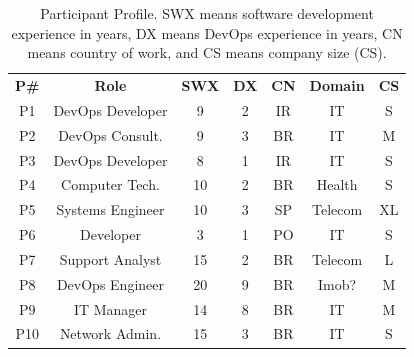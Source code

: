 \begin{table}[t]
\centering
\caption{Participant Profile. SWX means software development experience in years, DX means DevOps experience in years, CN means country of work, and CS means company size (CS).}
\label{participant_table}
\begin{tabular}{ccccccc}
\textbf{P\#}          & \textbf{Role}         & \textbf{SWX} & \textbf{DX} & \textbf{CN}   & \textbf{Domain}    & \multicolumn{1}{l}{\textbf{CS}} \\
P1                   & DevOps Developer      & 9            & 2           & IR            & IT                 & S                               \\

P2                   & DevOps Consult.       & 9            & 3           & BR            & IT                 & M                               \\

P3                   & DevOps Developer      & 8            & 1           & IR            & IT                 & S                               \\

P4                   & Computer Tech.        & 10           & 2           & BR            & Health             & S                               \\

P5                   & Systems Engineer      & 10           & 3           & SP            & Telecom            & XL                              \\

P6                   & Developer             & 3            & 1           & PO            & IT                 & S                               \\

P7                   & Support Analyst       & 15           & 2           & BR            & Telecom            & L                               \\

P8                   & DevOps Engineer       & 20           & 9           & BR            & Imob?              & M                               \\

P9                   & IT Manager            & 14           & 8           & BR            & IT                 & M                               \\

P10                  & Network Admin.        & 15           & 3           & BR            & IT                 & S                               \\


\end{tabular}
\end{table}

